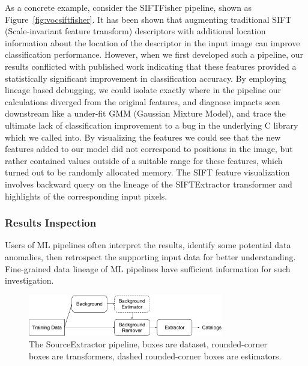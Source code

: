 \documentclass{sig-alternate}
\begin{document}
As a concrete example, consider the SIFTFisher pipeline, shown as Figure~\ref{fig:vocsiftfisher}. 
It has been shown that augmenting traditional SIFT~\cite{lowe99} (Scale-invariant feature transform) descriptors with additional location information about the location of the descriptor in the input image can improve classification performance.
However, when we first developed such a pipeline, our results conflicted with published work indicating that these features provided a statistically significant improvement in classification accuracy.
By employing lineage based debugging, we could isolate exactly where in the pipeline our calculations diverged from the original features, and diagnose impacts seen downstream like a under-fit GMM (Gaussian Mixture Model), and trace the ultimate lack of classification improvement to a bug in the underlying C library which we called into.
By visualizing the features we could see that the new features added to our model did not correspond to positions in the image, but rather contained values outside of a suitable range for these features, which turned out to be randomly allocated memory. The SIFT feature visualization involves backward query on the lineage of the SIFTExtractor transformer and highlights of the corresponding input pixels.


\subsubsection{Results Inspection}
Users of ML pipelines often interpret the results, identify some potential data anomalies, then retrospect the supporting input data for better understanding.
Fine-grained data lineage of ML pipelines have sufficient information for such investigation.

\begin{figure}[ht]
\begin{center}
    \includegraphics[width=85mm]{pictures/SourceExtractor}
    \caption {The SourceExtractor pipeline, boxes are dataset, rounded-corner boxes are transformers, dashed rounded-corner boxes are estimators.
    \label{fig:sourceextractor}
}
\end{center}
\end{figure}
\end{document}
